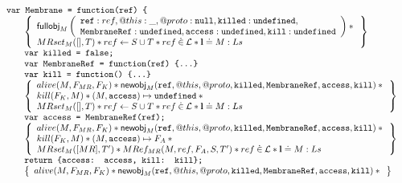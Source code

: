 \documentclass[a4paper,notitlepage]{report}
\begin{document}
\begin{figure}[b]
  \[
    \begin{array}{l}
      \tjs{var Membrane = function(ref) \{} \\
        \indblock{
          \logic{
            \fullobj_M \args{
              \js{ref}: ref, @this: \_, @proto: \nil, \js{killed}: \und, \\
              \js{MembraneRef}: \und, \js{access}: \und, \js{kill}: \und
            } \sep {} \\
            MRset_M([], T) \sep
            ref \bp S \cup T \sep
            ref \dotin \loc \sep
            \ls \doteq M:Ls
          } \\
          \tjs{var killed = false;} \\
          \tjs{var MembraneRef = function(ref) \{...\}} \\
          \tjs{var kill = function() \{...\}} \\
          \logic{
            alive(M, F_{MR}, F_K) \sep
            \newobj_M(\js{ref},@this,@proto,\js{killed},\js{MembraneRef},
                   \js{access},\js{kill}) \sep {} \\

            kill(F_K,M) \sep
            (M,\js{access}) \pointsto \und \sep {} \\

            MRset_M([], T) \sep
            ref \bp S \cup T \sep
            ref \dotin \loc \sep
            \ls \doteq M:Ls
          } \\
          \tjs{var access = MembraneRef(ref);} \\
          \logic{
            alive(M, F_{MR}, F_K) \sep
            \newobj_M(\js{ref},@this,@proto,\js{killed},\js{MembraneRef},
                   \js{access},\js{kill}) \sep {} \\

            kill(F_K,M) \sep
            (M,\js{access}) \pointsto F_A \sep {} \\

            MRset_M([MR], T') \sep
            MRef_{MR}(M,ref,F_A,S,T') \sep
            ref \dotin \loc \sep
            \ls \doteq M:Ls
          } \\
          \tjs{return \{access: access, kill: kill\};} \\
          \logic{
            alive(M, F_{MR}, F_K) \sep
            \newobj_M(\js{ref},@this,@proto,\js{killed},\js{MembraneRef},
                   \js{access},\js{kill}) \sep {} \\

}}
\end{array}\]
\end{figure}
\end{document}
